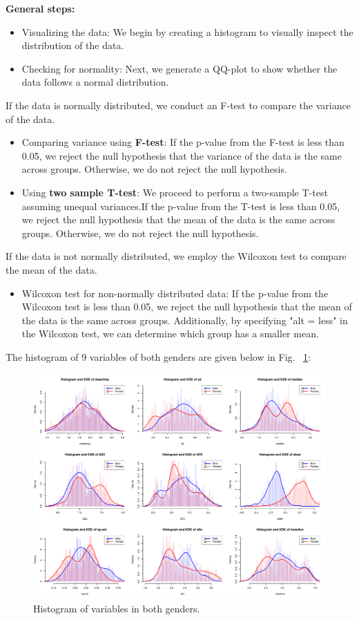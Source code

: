 \documentclass{article}
\begin{document}
	\textbf{General steps:}
	\begin{itemize}
		\item Visualizing the data: We begin by creating a histogram to visually inspect the distribution of the data.
		\item Checking for normality: Next, we generate a QQ-plot to show whether the data follows a normal distribution.
	\end{itemize}
	If the data is normally distributed, we conduct an F-test to compare the variance of the data.
	\begin{itemize}
		\item Comparing variance using \textbf{F-test}: If the p-value from the F-test is less than 0.05, we reject the null hypothesis that the variance of the data is the same across groups. Otherwise, we do not reject the null hypothesis.
		\item Using \textbf{two sample T-test}: We proceed to perform a two-sample T-test assuming unequal variances.If the p-value from the T-test is less than 0.05, we reject the null hypothesis that the mean of the data is the same across groups. Otherwise, we do not reject the null hypothesis.
	\end{itemize}
	If the data is not normally distributed, we employ the Wilcoxon test to compare the mean of the data.
	\begin{itemize}
		\item Wilcoxon test for non-normally distributed data: If the p-value from the Wilcoxon test is less than 0.05, we reject the null hypothesis that the mean of the data is the same across groups. Additionally, by specifying "alt = less" in the Wilcoxon test, we can determine which group has a smaller mean.
	\end{itemize}
	The histogram of 9 variables of both genders are given below in Fig. ~\ref{hist_bothgender}:
	\begin{figure}
		\centering
		\includegraphics[width=\textwidth]{graphs/gender/visualizations.pdf}
		\caption{Histogram of variables in both genders.}
		\label{hist_bothgender}
	\end{figure}
	
\end{document}
